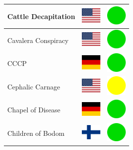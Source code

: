\documentclass[12pt, a4paper, twoside]{report}
\begin{document}
\begin{center}
\begin{longtable}{|p{5cm}|p{2cm}|p{2cm}|}
Cattle Decapitation & \includegraphics[width=1cm]{4x3/us} & \includegraphics[width=1cm]{likes/y} \\ \hline
Cavalera Conspiracy & \includegraphics[width=1cm]{4x3/us} & \includegraphics[width=1cm]{likes/y} \\ \hline
CCCP & \includegraphics[width=1cm]{4x3/de} & \includegraphics[width=1cm]{likes/y} \\ \hline
Cephalic Carnage & \includegraphics[width=1cm]{4x3/us} & \includegraphics[width=1cm]{likes/m} \\ \hline
Chapel of Disease & \includegraphics[width=1cm]{4x3/de} & \includegraphics[width=1cm]{likes/y} \\ \hline
Children of Bodom & \includegraphics[width=1cm]{4x3/fi} & \includegraphics[width=1cm]{likes/y} \\ \hline

\end{longtable}
\end{center}
\end{document}
